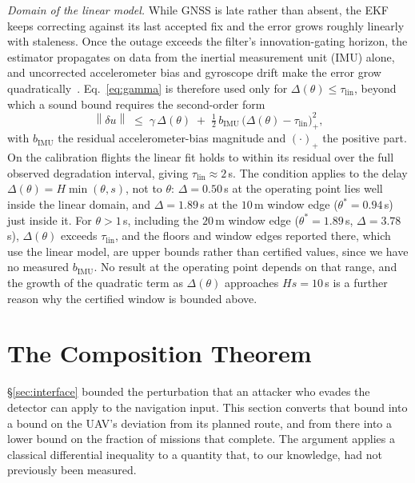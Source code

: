 \documentclass[conference,letterpaper,10pt]{IEEEtran}   %
\newcommand{\Norm}[1]{\left\lVert #1\right\rVert}
\begin{document}
\emph{Domain of the linear model.} While GNSS is late rather than absent, the
EKF keeps correcting against its last accepted fix and the error grows roughly
linearly with staleness. Once the outage exceeds the filter's innovation-gating
horizon, the estimator propagates on data from the inertial measurement unit
(IMU) alone, and uncorrected
accelerometer bias and gyroscope drift make the error grow
quadratically~\cite{kong2024px4ekf}. Eq.~\eqref{eq:gamma} is therefore used
only for $\Delta(\theta)\le\tau_{\mathrm{lin}}$, beyond which a sound bound
requires the second-order form
\begin{equation}
\label{eq:gamma_quad}
\Norm{\delta u}\;\le\;\gamma\,\Delta(\theta)\;+\;\tfrac12\,b_{\mathrm{IMU}}\,\big(\Delta(\theta)-\tau_{\mathrm{lin}}\big)_{+}^{2},
\end{equation}
with $b_{\mathrm{IMU}}$ the residual accelerometer-bias magnitude and
$(\cdot)_+$ the positive part. On the calibration flights the linear fit holds
to within its residual over the full observed degradation interval, giving
$\tau_{\mathrm{lin}}\approx2$\,s. The condition applies to the delay
$\Delta(\theta)=H\min(\theta,s)$, not to $\theta$: $\Delta=0.50$\,s at the
operating point lies well inside the linear domain, and $\Delta=1.89$\,s at the
$10$\,m window edge ($\theta^{*}=0.94$\,s) just inside it. For $\theta>1$\,s,
including the $20$\,m window edge ($\theta^{*}=1.89$\,s, $\Delta=3.78$\,s),
$\Delta(\theta)$ exceeds $\tau_{\mathrm{lin}}$, and the floors and window edges
reported there, which use the linear model, are upper bounds rather than
certified values, since we have no measured $b_{\mathrm{IMU}}$. No result at the
operating point depends on that range, and the growth of the quadratic term as
$\Delta(\theta)$ approaches $Hs=10$\,s is a further reason why the certified
window is bounded above.

\section{The Composition Theorem}
\label{sec:theorem}
\S\ref{sec:interface} bounded the perturbation that an attacker who evades the
detector can apply to the navigation input. This section converts that bound
into a bound on the UAV's deviation from its planned route, and from there
into a lower bound on the fraction of missions that complete. The argument
applies a classical differential inequality to a quantity that, to our
knowledge, had not previously been measured.
\end{document}
